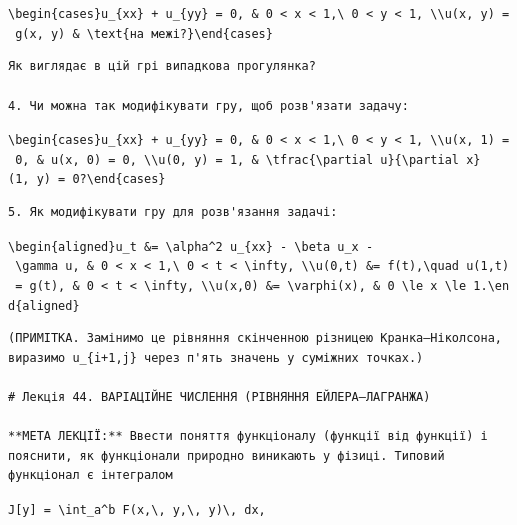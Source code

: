 \documentclass[
  ukrainian,
]{article}
\begin{document}
\texttt{\textbackslash{}begin\{cases\}u\_\{xx\}\ +\ u\_\{yy\}\ =\ 0,\ \&\ 0\ \textless{}\ x\ \textless{}\ 1,\textbackslash{}\ 0\ \textless{}\ y\ \textless{}\ 1,\ \textbackslash{}\textbackslash{}u(x,\ y)\ =\ g(x,\ y)\ \&\ \textbackslash{}text\{на\ межі?\}\textbackslash{}end\{cases\}}

\begin{verbatim}
Як виглядає в цій грі випадкова прогулянка?

4. Чи можна так модифікувати гру, щоб розв'язати задачу:
\end{verbatim}

\texttt{\textbackslash{}begin\{cases\}u\_\{xx\}\ +\ u\_\{yy\}\ =\ 0,\ \&\ 0\ \textless{}\ x\ \textless{}\ 1,\textbackslash{}\ 0\ \textless{}\ y\ \textless{}\ 1,\ \textbackslash{}\textbackslash{}u(x,\ 1)\ =\ 0,\ \&\ u(x,\ 0)\ =\ 0,\ \textbackslash{}\textbackslash{}u(0,\ y)\ =\ 1,\ \&\ \textbackslash{}tfrac\{\textbackslash{}partial\ u\}\{\textbackslash{}partial\ x\}(1,\ y)\ =\ 0?\textbackslash{}end\{cases\}}

\begin{verbatim}
5. Як модифікувати гру для розв'язання задачі:
\end{verbatim}

\texttt{\textbackslash{}begin\{aligned\}u\_t\ \&=\ \textbackslash{}alpha\^{}2\ u\_\{xx\}\ -\ \textbackslash{}beta\ u\_x\ -\ \textbackslash{}gamma\ u,\ \&\ 0\ \textless{}\ x\ \textless{}\ 1,\textbackslash{}\ 0\ \textless{}\ t\ \textless{}\ \textbackslash{}infty,\ \textbackslash{}\textbackslash{}u(0,t)\ \&=\ f(t),\textbackslash{}quad\ u(1,t)\ =\ g(t),\ \&\ 0\ \textless{}\ t\ \textless{}\ \textbackslash{}infty,\ \textbackslash{}\textbackslash{}u(x,0)\ \&=\ \textbackslash{}varphi(x),\ \&\ 0\ \textbackslash{}le\ x\ \textbackslash{}le\ 1.\textbackslash{}end\{aligned\}}

\begin{verbatim}
(ПРИМІТКА. Замінимо це рівняння скінченною різницею Кранка–Ніколсона, виразимо u_{i+1,j} через п'ять значень у суміжних точках.)

# Лекція 44. ВАРІАЦІЙНЕ ЧИСЛЕННЯ (РІВНЯННЯ ЕЙЛЕРА–ЛАГРАНЖА)

**МЕТА ЛЕКЦІЇ:** Ввести поняття функціоналу (функції від функції) і пояснити, як функціонали природно виникають у фізиці. Типовий функціонал є інтегралом
\end{verbatim}

\texttt{J{[}y{]}\ =\ \textbackslash{}int\_a\^{}b\ F(x,\textbackslash{},\ y,\textbackslash{},\ y\textquotesingle{})\textbackslash{},\ dx,}
\end{document}
